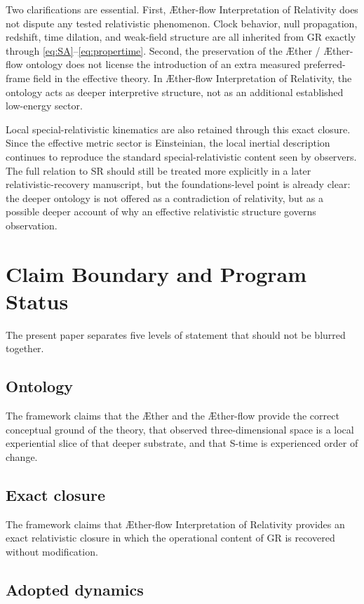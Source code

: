 \documentclass[11pt]{article}
\newcommand{\Aether}{\AE{}ther}
\newcommand{\Aflow}{\AE{}ther-flow}
\newcommand{\TheoryName}{\Aflow{} Interpretation of Relativity}
\begin{document}
Two clarifications are essential. First, \TheoryName{} does not dispute any tested relativistic phenomenon. Clock behavior, null propagation, redshift, time dilation, and weak-field structure are all inherited from GR exactly through \eqref{eq:SA}--\eqref{eq:propertime}. Second, the preservation of the \Aether{} / \Aflow{} ontology does not license the introduction of an extra measured preferred-frame field in the effective theory. In \TheoryName{}, the ontology acts as deeper interpretive structure, not as an additional established low-energy sector.

Local special-relativistic kinematics are also retained through this exact closure. Since the effective metric sector is Einsteinian, the local inertial description continues to reproduce the standard special-relativistic content seen by observers. The full relation to SR should still be treated more explicitly in a later relativistic-recovery manuscript, but the foundations-level point is already clear: the deeper ontology is not offered as a contradiction of relativity, but as a possible deeper account of why an effective relativistic structure governs observation.

\section{Claim Boundary and Program Status}

The present paper separates five levels of statement that should not be blurred together.

\subsection{Ontology}

The framework claims that the \Aether{} and the \Aflow{} provide the correct conceptual ground of the theory, that observed three-dimensional space is a local experiential slice of that deeper substrate, and that S-time is experienced order of change.

\subsection{Exact closure}

The framework claims that \TheoryName{} provides an exact relativistic closure in which the operational content of GR is recovered without modification.

\subsection{Adopted dynamics}
\end{document}
